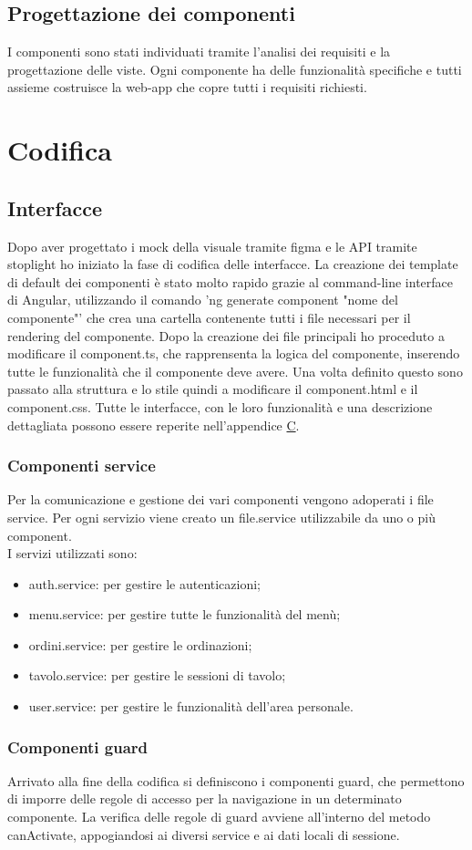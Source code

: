 \subsection{Progettazione dei componenti}
I componenti sono stati individuati tramite l'analisi dei requisiti e la progettazione delle viste. Ogni componente ha delle funzionalità specifiche e tutti assieme costruisce la web-app che copre tutti i requisiti richiesti.
\\
\section{Codifica}
\subsection{Interfacce}
Dopo aver progettato i mock della visuale tramite figma e le API tramite stoplight ho iniziato la fase di codifica delle interfacce. La creazione dei template di default dei componenti è stato molto rapido grazie al command-line interface di Angular, utilizzando il comando 'ng generate component "nome del componente"' che crea una cartella contenente tutti i file necessari per il rendering del componente. Dopo la creazione dei file principali ho proceduto a modificare il component.ts, che rapprensenta la logica del componente, inserendo tutte le funzionalità che il componente deve avere. Una volta definito questo sono passato alla struttura e lo stile quindi a modificare il component.html e il component.css.
Tutte le interfacce, con le loro funzionalità e una descrizione dettagliata possono essere reperite nell'appendice {\hyperref[cap:appendice c]{C}}.
\subsubsection{Componenti service}
Per la comunicazione e gestione dei vari componenti vengono adoperati i file service. Per ogni servizio viene creato un file.service utilizzabile da uno o più component.\\
I servizi utilizzati sono:
\begin{itemize}
    \item auth.service: per gestire le autenticazioni;
    \item menu.service: per gestire tutte le funzionalità del menù;
    \item ordini.service: per gestire le ordinazioni;
    \item tavolo.service: per gestire le sessioni di tavolo;
    \item user.service: per gestire le funzionalità dell'area personale.
\end{itemize}
\subsubsection{Componenti guard}
Arrivato alla fine della codifica si definiscono i componenti guard, che permettono di imporre delle regole di accesso per la navigazione in un determinato componente. La verifica delle regole di guard avviene all'interno del metodo canActivate, appogiandosi ai diversi service e ai dati locali di sessione.